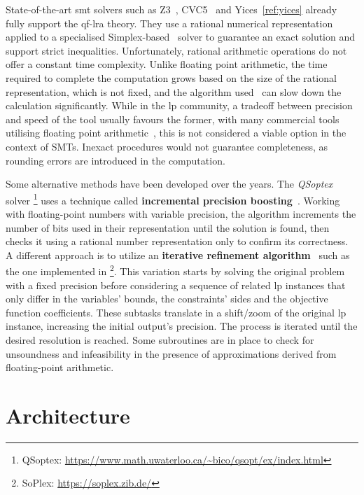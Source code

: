 \documentclass[runningheads]{llncs}
\begin{document}
State-of-the-art \gls{smt} solvers such as Z3~\cite{ref:z3}, CVC5~\cite{ref:cvc5} and Yices~\ref{ref:yices} already fully support the \gls{qf-lra} theory.
They use a rational numerical representation applied to a specialised Simplex-based~\cite{ref:simplex} solver to guarantee an exact solution and support strict inequalities.
Unfortunately, rational arithmetic operations do not offer a constant time complexity. %
Unlike floating point arithmetic, the time required to complete the computation grows based on the size of the rational representation, which is not fixed, and the algorithm used~\cite{ref:fft-mult} can slow down the calculation significantly.
While in the \gls{lp} community, a tradeoff between precision and speed of the tool usually favours the former, with many commercial tools utilising floating point arithmetic~\cite{ref:gurobi}, this is not considered a viable option in the context of SMTs.
Inexact procedures would not guarantee completeness, as rounding errors are introduced in the computation.

Some alternative methods have been developed over the years.
The \textit{QSoptex} solver \footnote{QSoptex: \url{https://www.math.uwaterloo.ca/~bico/qsopt/ex/index.html}} uses a technique called \textbf{incremental precision boosting}~\cite{ref:precision-boosting}.
Working with floating-point numbers with variable precision, the algorithm increments the number of bits used in their representation until the solution is found, then checks it using a rational number representation only to confirm its correctness.
A different approach is to utilize an \textbf{iterative refinement algorithm}~\cite{ref:iterative-refinement} such as the one implemented in \soplex \footnote{SoPlex: \url{https://soplex.zib.de/}}.
This variation starts by solving the original problem with a fixed precision before considering a sequence of related \gls{lp} instances that only differ in the variables' bounds, the constraints' sides and the objective function coefficients.
These subtasks translate in a shift/zoom of the original \gls{lp} instance, increasing the initial output's precision.
The process is iterated until the desired resolution is reached.
Some subroutines are in place to check for unsoundness and infeasibility in the presence of approximations derived from floating-point arithmetic.

\section{Architecture}
\label{sec:architecture}
\end{document}
